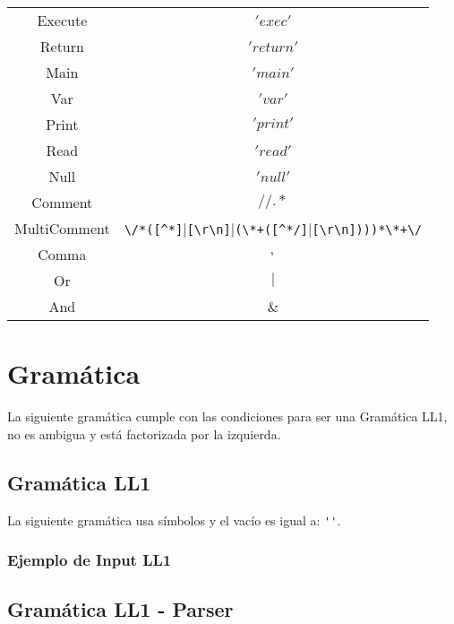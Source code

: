 \documentclass[https://www.overleaf.com/project/63761df255a8a9f4a15c3579
	letterpaper, %
	10pt, %
]{CSUniSchoolLabReport}
\begin{document}
\begin{center}
\begin{tabular}{| c | c |}
                Execute & \('exec'\) \\ 
                Return & \('return'\) \\ 
                Main & \('main'\) \\
                Var & \('var'\) \\
                Print & \('print'\) \\
                Read & \('read'\) \\
                Null & \('null'\) \\
                Comment & \(//.*\) \\
                MultiComment & \verb|\/*([^*]||\verb|[\r\n]||\verb|(\*+([^*/]||\verb|[\r\n])))*\*+\/| \\
                Comma & \(,\) \\
                Or & \(|\) \\
                And & \(\&\) \\
            \hline
        \end{tabular}
    \end{center}

    
    \section{Gramática}
    
    La siguiente gramática cumple con las condiciones para ser una Gramática LL1, no es ambigua y está factorizada por la izquierda.
    
    \subsection{Gramática LL1}

        La siguiente gramática usa símbolos y el vacío es igual a: \verb|''|.
        

        \subsubsection{Ejemplo de Input LL1}
            
        
    \subsection{Gramática LL1 - Parser}
\end{document}
